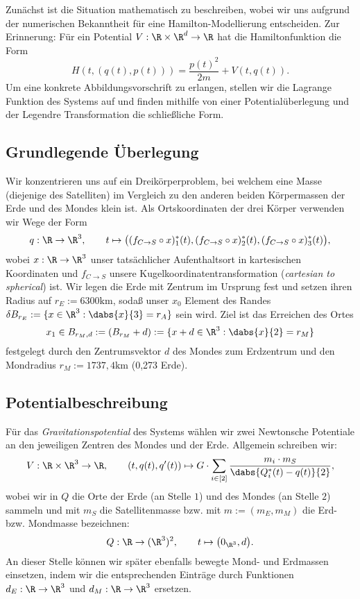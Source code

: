 \documentclass{subfiles}
\begin{document}
    

    Zunächst ist die Situation mathematisch zu beschreiben, wobei wir uns aufgrund der numerischen Bekanntheit für eine Hamilton-Modellierung entscheiden. Zur Erinnerung: Für ein Potential $V:\R\times\R^d\to\R$ hat die Hamiltonfunktion die Form 
    \[
        H(t,(q(t),p(t))) = \frac{p(t)^2}{2m} + V(t,q(t)).
    \]
    Um eine konkrete Abbildungsvorschrift zu erlangen, stellen wir die Lagrange Funktion des Systems auf und finden mithilfe von einer Potentialüberlegung und der Legendre Transformation die schließliche Form. 

    \subsection*{Grundlegende Überlegung}
        Wir konzentrieren uns auf ein Dreikörperproblem, bei welchem eine Masse (diejenige des Satelliten) im Vergleich zu den anderen beiden Körpermassen der Erde und des Mondes klein ist. Als Ortskoordinaten der drei Körper verwenden wir Wege der Form 
        \[
            q:\R\to\R^3,\qquad t\mapsto \bigl((f_{C\to S}\circ x)_1^*(t),(f_{C\to S}\circ x)_2^*(t),(f_{C\to S}\circ x)_3^*(t)\bigr),
        \]
        wobei $x:\R\to\R^3$ unser tatsächlicher Aufenthaltsort in kartesischen Koordinaten und $f_{C\to S}$ unsere Kugelkoordinatentransformation (\emph{cartesian to spherical}) ist. Wir legen die Erde mit Zentrum im Ursprung fest und setzen ihren Radius auf $r_E:=6300\si{\kilo\metre}$, sodaß unser $x_0$ Element des Randes $\delta B_{r_E}:=\{x\in\R^3:\dabs{x}{3} = r_A\}$ sein wird. Ziel ist das Erreichen des Ortes
        \[
            x_1\in B_{r_M,d}:=(B_{r_M}+d):=\{x + d\in\R^3:\dabs{x}{2} = r_M\}
        \]
        festgelegt durch den Zentrumsvektor $d$ des Mondes zum Erdzentrum und den Mondradius $r_M:=1 737,4\si{\kilo\metre}$ (0,273 Erde).

    \subsection*{Potentialbeschreibung}
        Für das \emph{Gravitationspotential} des Systems wählen wir zwei Newtonsche Potentiale an den jeweiligen Zentren des Mondes und der Erde. Allgemein schreiben wir:
        \[
            V:\R\times\R^3\to \R,\qquad (t,q(t),q'(t))\mapsto G\cdot\sum_{i\in[2]}\frac{m_i\cdot m_S}{\dabs{Q_i^*(t) - q(t)}{2}},
        \]
        wobei wir in $Q$ die Orte der Erde (an Stelle $1$) und des Mondes (an Stelle $2$) sammeln und mit $m_S$ die Satellitenmasse bzw. mit $m:=(m_E,m_M)$ die Erd- bzw. Mondmasse bezeichnen:
        \[
            Q:\R\to(\R^3)^2,\qquad t\mapsto \bigl(0_{\R^3},d\bigr).
        \]
        An dieser Stelle können wir später ebenfalls bewegte Mond- und Erdmassen einsetzen, indem wir die entsprechenden Einträge durch Funktionen $d_E:\R\to\R^3$ und $d_M:\R\to\R^3$ ersetzen.
\end{document}
